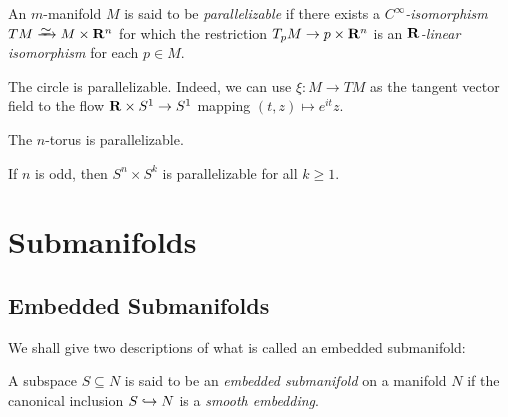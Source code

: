 \begin{definition}
    \label{def:parallelizable-manifold}
    An \(m\)-manifold \(M\) is said to be \emph{parallelizable} if there exists a
    \emph{\(C^{\infty}\)-isomorphism} \(T M \isoto M \times \R^n\) for which the
    restriction \(T_p M \to p \times \mathbf{R}^n\) is an \emph{\(\mathbf{R}\)-linear isomorphism}
    for each \(p \in M\).
\end{definition}

\begin{example}
    \label{exp:S1-parallelizable}
    The circle is parallelizable. Indeed, we can use \(\xi: M \to T M\) as the
    tangent vector field to the flow \(\mathbf{R} \times S^1 \to S^1\) mapping
    \((t, z) \mapsto e^{i t} z\).
\end{example}

\begin{proposition}
    \label{prop:n-torus-parallelizable}
    The \(n\)-torus is parallelizable.
\end{proposition}

\begin{proposition}
    \label{prop:Sn-times-Sk-parallelizable}
    If \(n\) is odd, then \(S^n \times S^k\) is parallelizable for all \(k \geq 1\).
\end{proposition}


\section{Submanifolds}

\subsection{Embedded Submanifolds}

We shall give two descriptions of what is called an embedded submanifold:

\begin{definition}
    \label{def:embedded-submanifold}
    A subspace \(S \subseteq N\) is said to be an \emph{embedded submanifold} on a
    manifold \(N\) if the canonical inclusion \(S \hookrightarrow N\) is a \emph{smooth
        embedding}.
\end{definition}

